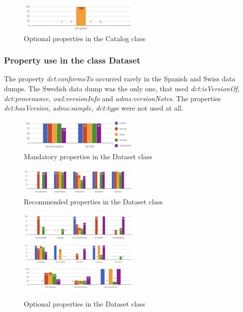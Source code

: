 \documentclass[<options>]{elsarticle}
\begin{document}
\begin{figure}[!h]
\includegraphics{Replace6.png}
\caption{Optional properties in the Catalog class}
\end{figure}

\subsubsection{Property use in the class Dataset}
The property \textit{dct:conformsTo} occurred rarely in the Spanish and Swiss data dumps. The Swedish data dump was the only one, that used \textit{dct:isVersionOf, dct:provenance, owl:versionInfo} and \textit{adms:versionNotes}. The properties  \textit{dct:hasVersion, adms:sample, dct:type} were not used at all.

\begin{figure}[!h]
\includegraphics{replace7.png}
\caption{Mandatory properties in the Dataset class}
\end{figure}

\begin{figure}[!h]
\includegraphics{replace8.png}
\caption{Recommended properties in the Dataset class}
\end{figure}

\begin{figure}[!h]
\includegraphics{replace9.png}
\includegraphics{replace10.png}
\includegraphics{replace11.png}
\caption{Optional properties in the Dataset class}
\end{figure}
\end{document}
